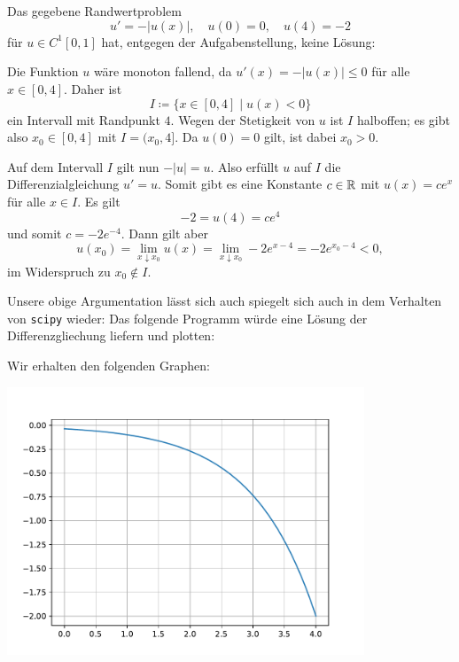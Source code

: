 \section{}

Das gegebene Randwertproblem
\[
        u' = -|u(x)|,
  \quad u(0) =  0,
  \quad u(4) = -2
\]
für $u \in C^1[0,1]$ hat, entgegen der Aufgabenstellung, keine Lösung:

Die Funktion $u$ wäre monoton fallend, da $u'(x) = -|u(x)| \leq 0$ für alle $x \in [0,4]$.
Daher ist
\[
            I
  \coloneqq \{
              x \in [0,4]
            \mid
              u(x) < 0
            \}
\]
ein Intervall mit Randpunkt $4$.
Wegen der Stetigkeit von $u$ ist $I$ halboffen;
es gibt also $x_0 \in [0,4]$ mit $I = (x_0, 4]$.
Da $u(0) = 0$ gilt, ist dabei $x_0 > 0$.

Auf dem Intervall $I$ gilt nun $-|u| = u$.
Also erfüllt $u$ auf $I$ die Differenzialgleichung $u' = u$.
Somit gibt es eine Konstante $c \in \mathbb{R}$ mit $u(x) = c e^x$ für alle $x \in I$.
Es gilt
\[
    -2
  = u(4)
  = c e^4
\]
und somit $c = -2 e^{-4}$.
Dann gilt aber
\[
    u(x_0)
  = \lim_{x \downarrow x_0} u(x)
  = \lim_{x \downarrow x_0} -2 e^{x-4}
  = -2 e^{x_0-4}
  < 0,
\]
im Widerspruch zu $x_0 \notin I$.

Unsere obige Argumentation lässt sich auch spiegelt sich auch in dem Verhalten von \texttt{scipy} wieder:
Das folgende Programm würde eine Lösung der Differenzgliechung liefern und plotten:



Wir erhalten den folgenden Graphen:

\begin{center}
  \includegraphics[width = 0.8\textwidth]{chapter_04/exercise_04_22_figure_1.pdf}
\end{center}

